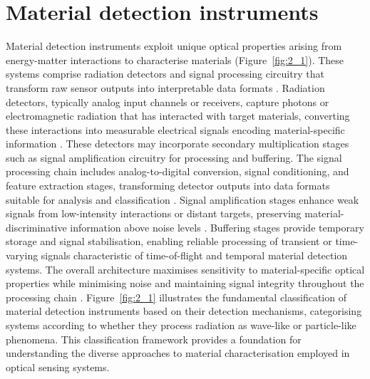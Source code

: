 \documentclass[12pt,a4paper,oneside]{report}
\let\oldsection\section
\renewcommand{\section}{\clearpage\oldsection}
\begin{document}
\newpage
\section{Material detection instruments}
\label{sec:material_detection_instruments}

Material detection instruments exploit unique optical properties arising from energy-matter interactions to characterise materials \cite{elachi2021} (Figure~\ref{fig:2_1}). These systems comprise radiation detectors and signal processing circuitry that transform raw sensor outputs into interpretable data formats \cite{bass2010}. Radiation detectors, typically analog input channels or receivers, capture photons or electromagnetic radiation that has interacted with target materials, converting these interactions into measurable electrical signals encoding material-specific information \cite{kolanoski2020,piron2020}. These detectors may incorporate secondary multiplication stages such as signal amplification circuitry for processing and buffering. The signal processing chain includes analog-to-digital conversion, signal conditioning, and feature extraction stages, transforming detector outputs into data formats suitable for analysis and classification \cite{bass2010}. Signal amplification stages enhance weak signals from low-intensity interactions or distant targets, preserving material-discriminative information above noise levels \cite{piron2020}. Buffering stages provide temporary storage and signal stabilisation, enabling reliable processing of transient or time-varying signals characteristic of time-of-flight and temporal material detection systems. The overall architecture maximises sensitivity to material-specific optical properties while minimising noise and maintaining signal integrity throughout the processing chain \cite{bass2010,piron2020}. Figure~\ref{fig:2_1} illustrates the fundamental classification of material detection instruments based on their detection mechanisms, categorising systems according to whether they process radiation as wave-like or particle-like phenomena. This classification framework provides a foundation for understanding the diverse approaches to material characterisation employed in optical sensing systems.
\end{document}
